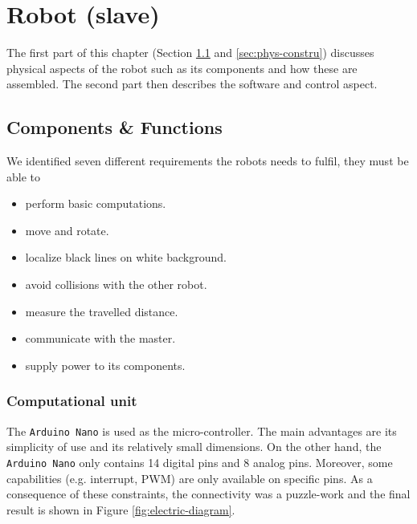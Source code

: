 \documentclass[12pt]{report}
\begin{document}


\chapter{Robot (slave)}\label{chapter-construction}
The first part of this chapter (Section \ref{sec:components} and \ref{sec:phys-constru}) discusses physical aspects of the robot such as its components and how these are assembled. The second part then describes the software and control aspect.

\section{Components \& Functions}\label{sec:components}
We identified seven different requirements the robots needs to fulfil, they must be able to 
\begin{itemize}
\item perform basic computations.
\item move and rotate.
\item localize black lines on white background.
\item avoid collisions with the other robot.
\item measure the travelled distance.
\item communicate with the master.
\item supply power to its components.
\end{itemize}

\subsection*{Computational unit}
The \texttt{Arduino Nano} is used as the micro-controller. The main advantages are its simplicity of use and its relatively small dimensions. On the other hand, the \texttt{Arduino Nano} only contains 14 digital pins and 8 analog pins. Moreover, some capabilities (e.g. interrupt, PWM) are only available on specific pins. As a consequence of these constraints, the connectivity was a puzzle-work and the final result is shown in Figure \ref{fig:electric-diagram}.
\end{document}
